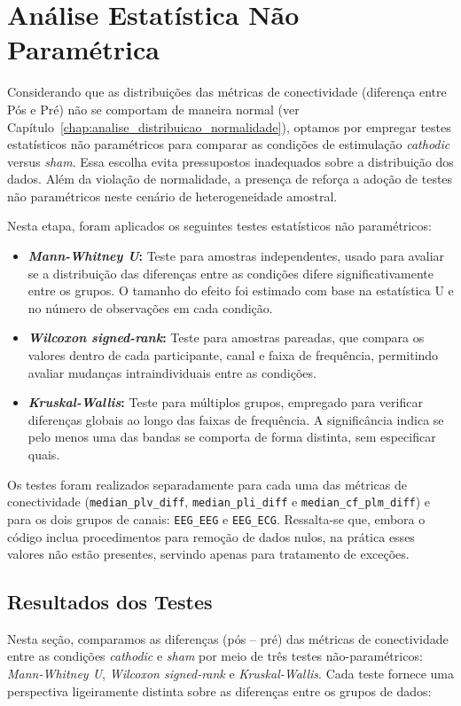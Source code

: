 \chapter{Análise Estatística Não Paramétrica}
\label{chap:analise_estatistica_np}
Considerando que as distribuições das métricas de conectividade (diferença entre Pós e Pré) não se comportam de maneira normal (ver Capítulo~\ref{chap:analise_distribuicao_normalidade}), optamos por empregar testes estatísticos não paramétricos para comparar as condições de estimulação \textit{cathodic} versus \textit{sham}. Essa escolha evita pressupostos inadequados sobre a distribuição dos dados. Além da violação de normalidade, a presença de  reforça a adoção de testes não paramétricos neste cenário de heterogeneidade amostral.

Nesta etapa, foram aplicados os seguintes testes estatísticos não paramétricos:

\begin{itemize}
    \item \textbf{\textit{Mann-Whitney U}:} Teste para amostras independentes, usado para avaliar se a distribuição das diferenças entre as condições difere significativamente entre os grupos. O tamanho do efeito foi estimado com base na estatística U e no número de observações em cada condição.
    
    \item \textbf{\textit{Wilcoxon signed-rank}:} Teste para amostras pareadas, que compara os valores dentro de cada participante, canal e faixa de frequência, permitindo avaliar mudanças intraindividuais entre as condições.

    \item \textbf{\textit{Kruskal-Wallis}:} Teste para múltiplos grupos, empregado para verificar diferenças globais ao longo das faixas de frequência. A significância indica se pelo menos uma das bandas se comporta de forma distinta, sem especificar quais.
\end{itemize}

Os testes foram realizados separadamente para cada uma das métricas de conectividade (\texttt{median\_plv\_diff}, \texttt{median\_pli\_diff} e \texttt{median\_cf\_plm\_diff}) e para os dois grupos de canais: \texttt{EEG\_EEG} e \texttt{EEG\_ECG}. Ressalta-se que, embora o código inclua procedimentos para remoção de dados nulos, na prática esses valores não estão presentes, servindo apenas para tratamento de exceções.

\section{Resultados dos Testes}
Nesta seção, comparamos as diferenças (pós -- pré) das métricas de conectividade entre as condições \textit{cathodic} e \textit{sham} por meio de três testes não-paramétricos: \textit{Mann-Whitney U}, \textit{Wilcoxon signed-rank} e \textit{Kruskal-Wallis}. Cada teste fornece uma perspectiva ligeiramente distinta sobre as diferenças entre os grupos de dados:

